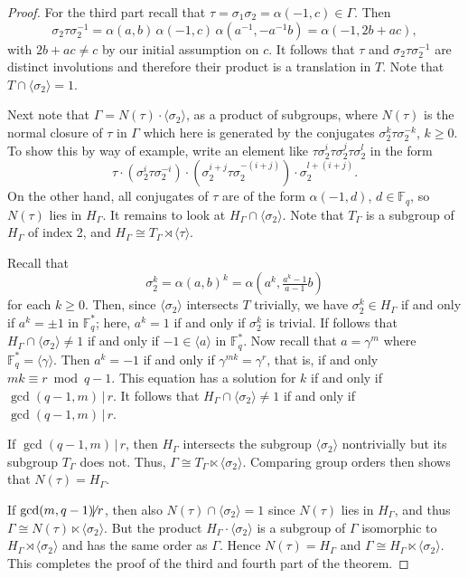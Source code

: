 \documentclass[12pt]{article}
\theoremstyle{definition}\newtheorem{definition}{Definition}[section]
\begin{document}
\begin{proof}
For the third part recall that $\tau=\sigma_1\sigma_2=\alpha(-1,c)\in\Gamma$. Then 
\[\sigma_2\tau\sigma_2^{-1}=\alpha(a,b)\,\alpha(-1,c)\,\alpha(a^{-1},-a^{-1}b)
=\alpha(-1,2b+ac),\]
with $2b+ac\neq c$ by our initial assumption on $c$. It follows that $\tau$ and $\sigma_2\tau\sigma_2^{-1}$ are distinct involutions and therefore their product is a translation in $T$. Note that $T\cap\langle\sigma_2\rangle=1$.

Next note that $\Gamma=N(\tau)\cdot \langle\sigma_2\rangle$, as a product of subgroups, where $N(\tau)$ is the normal closure of $\tau$ in $\Gamma$ which here is generated by the conjugates $\sigma_2^{k}\tau\sigma_{2}^{-k}$, $k\geq 0$. To show this by way of example, write an element like $\tau\sigma_2^i\tau\sigma_2^j\tau\sigma_2^l$ in the form 
\[\tau\cdot (\sigma_2^i\tau\sigma_2^{-i})\cdot(\sigma_2^{i+j}\tau\sigma_2^{-(i+j)})\cdot\sigma_2^{l+(i+j)}.\]
On the other hand, all conjugates of $\tau$ are of the form $\alpha(-1,d)$, $d\in\mathbb{F}_q$, so $N(\tau)$ lies in $H_\Gamma$. It remains to look at $H_{\Gamma}\cap\langle\sigma_2\rangle$. Note that $T_\Gamma$ is a subgroup of $H_\Gamma$ of index 2, and $H_\Gamma\cong T_{\Gamma}\rtimes \langle\tau\rangle$.

Recall that 
\[\sigma_2^k=\alpha(a,b)^k = \alpha(a^k, \tfrac{a^k-1}{a-1}b)\]
for each $k\geq 0$. Then, since $\langle\sigma_2\rangle$ intersects $T$ trivially, we have $\sigma_2^{k}\in H_\Gamma$ if and only if $a^{k}=\pm 1$ in $\mathbb{F}_q^*$; here, $a^{k}=1$ if and only if $\sigma_2^k$ is trivial. If follows that $H_{\Gamma}\cap\langle\sigma_2\rangle\neq 1$ if and only if $-1\in\langle a\rangle$ in $\mathbb{F}_q^*$. Now recall that $a=\gamma^m$ where $\mathbb{F}_q^*=\langle\gamma\rangle$. Then $a^{k}=-1$ if and only if $\gamma^{mk}=\gamma^r$, that is, if and only $mk\equiv r \bmod q-1$. 
This equation has a solution for $k$ if and only if $\gcd(q-1,m)\,|\,r$. It follows that 
$H_{\Gamma}\cap\langle\sigma_2\rangle\neq 1$ if and only if $\gcd(q-1,m)\,|\,r$. 

If $\gcd(q-1,m)\,|\,r$, then $H_\Gamma$ intersects the subgroup $\langle\sigma_2\rangle$ nontrivially but its subgroup $T_\Gamma$ does not. Thus, $\Gamma \cong T_\Gamma \ltimes \langle \sigma_2 \rangle$. Comparing group orders then shows that $N(\tau)=H_\Gamma$.

If $\gcd(m,q-1)\!\!\!\not\!|\,r$, then also $N(\tau)\cap\langle\sigma_2\rangle=1$ since $N(\tau)$ lies in $H_\Gamma$, and thus $\Gamma \cong N(\tau) \ltimes \langle \sigma_2 \rangle$. 
But the product $H_{\Gamma}\cdot\!\langle \sigma_2 \rangle$ is a subgroup of $\Gamma$ isomorphic to $H_{\Gamma}\rtimes\langle \sigma_2 \rangle$ and has the same order as $\Gamma$. Hence $N(\tau)=H_\Gamma$ and $\Gamma \cong H_\Gamma \ltimes \langle \sigma_2 \rangle$. This completes the proof of the third and fourth part of the theorem.


\end{proof}
\end{document}
